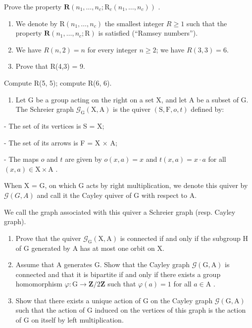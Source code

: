 Prove the property \(\boldsymbol{R}(n_{1},\ldots,n_{c};\mathrm{R}_{c}(n_{1},\ldots,n_{c}))\) .

\begin{enumerate}
\def\labelenumi{\alph{enumi})}
\setcounter{enumi}{3}
\item
  We denote by \(\mathrm{R}(n_{1},\ldots,n_{c})\) the smallest integer \(R\geqslant1\) such that the property \(\boldsymbol{R}(n_{1},\ldots,n_{c};\mathrm{R})\) is satisfied (“Ramsey numbers”).
\item
  We have \(R(n,2)=n\) for every integer \(n\geqslant2\); we have \(R(3,3)=6\).
\item
  Prove that R(4,3) = 9.
\end{enumerate}

Compute R(5, 5); compute R(6, 6).

\begin{enumerate}
\def\labelenumi{\arabic{enumi})}
\setcounter{enumi}{6}
\tightlist
\item
  Let G be a group acting on the right on a set X, and let A be a subset of G. The Schreier graph \(\mathcal{G}_{\mathrm{G}}(\mathrm{X},\mathrm{A})\) is the quiver \((\mathrm{S},\mathrm{F},o,t)\) defined by:
\end{enumerate}

- The set of its vertices is S = X;

- The set of its arrows is F = X × A;

- The maps \(o\) and \(t\) are given by \(o(x, a) = x\) and \(t(x, a) = x \cdot a\) for all \((x, a) \in \mathrm{X} \times \mathrm{A}\) .

  When X = G, on which G acts by right multiplication, we denote this quiver by \(\mathcal{G}(G,A)\) and call it the Cayley quiver of G with respect to A.

We call the graph associated with this quiver a Schreier graph (resp. Cayley graph).

\begin{enumerate}
\def\labelenumi{\alph{enumi})}
\item
  Prove that the quiver \(\mathcal{G}_{\mathrm{G}}(\mathrm{X},\mathrm{A})\) is connected if and only if the subgroup H of G generated by A has at most one orbit on X.
\item
  Assume that A generates G. Show that the Cayley graph \(\mathcal{G}(\mathrm{G},\mathrm{A})\) is connected and that it is bipartite if and only if there exists a group homomorphism \(\varphi \colon \mathrm{G}\to \mathbf{Z} / 2\mathbf{Z}\) such that \(\varphi (a) = 1\) for all \(a\in \mathrm{A}\) .
\item
  Show that there exists a unique action of G on the Cayley graph \(\mathcal{G}(\mathrm{G},\mathrm{A})\) such that the action of G induced on the vertices of this graph is the action of G on itself by left multiplication.
\end{enumerate}


